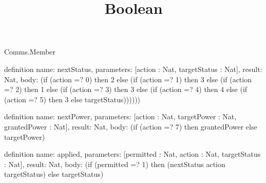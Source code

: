 \begin{lexlean}{Comms.Member}
\title{Boolean}
\begin{semanticmodule}
definition{
  name: nextStatus,
  parameters: [action : Nat, targetStatus : Nat],
  result: Nat,
  body: (if (action =? 0) then 2 else (if (action =? 1) then 3 else (if (action =? 2) then 1 else (if (action =? 3) then 3 else (if (action =? 4) then 4 else (if (action =? 5) then 3 else targetStatus))))))
}

definition{
  name: nextPower,
  parameters: [action : Nat, targetPower : Nat, grantedPower : Nat],
  result: Nat,
  body: (if (action =? 7) then grantedPower else targetPower)
}

definition{
  name: applied,
  parameters: [permitted : Nat, action : Nat, targetStatus : Nat],
  result: Nat,
  body: (if (permitted =? 1) then (nextStatus action targetStatus) else targetStatus)
}
\end{semanticmodule}
\end{lexlean}
